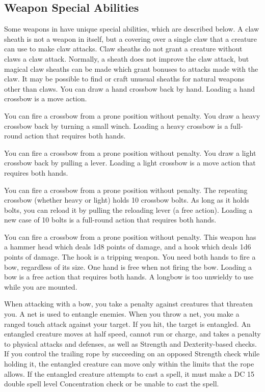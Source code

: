 \subsection{Weapon Special Abilities}
Some weapons in  have unique special abilities, which are described below.
 A claw sheath is not a weapon in itself, but a covering over a single claw that a creature can use to make claw attacks. Claw sheaths do not grant a creature without claws a claw attack. Normally, a sheath does not improve the claw attack, but magical claw sheaths can be made which grant bonuses to attacks made with the claw. It may be possible to find or craft unusual sheaths for natural weapons other than claws.
 You can draw a hand crossbow back by hand. Loading a hand crossbow is a move action.
\par You can fire a crossbow from a prone position without penalty.
 You draw a heavy crossbow back by turning a small winch. Loading a heavy crossbow is a full-round action that requires both hands.
\par You can fire a crossbow from a prone position without penalty.
 You draw a light crossbow back by pulling a lever. Loading a light crossbow is a move action that requires both hands.
\par You can fire a crossbow from a prone position without penalty.
 The repeating crossbow (whether heavy or light) holds 10 crossbow bolts. As long as it holds bolts, you can reload it by pulling the reloading lever (a free action). Loading a new case of 10 bolts is a full-round action that requires both hands.
\par You can fire a crossbow from a prone position without penalty.
 This weapon has a hammer head which deals 1d8 points of damage, and a hook which deals 1d6 points of damage. The hook is a tripping weapon.
 You need both hands to fire a bow, regardless of its size. One hand is free when not firing the bow. Loading a bow is a free action that requires both hands. A longbow is too unwieldy to use while you are mounted.
\par When attacking with a bow, you take a  penalty against creatures that threaten you.
 A net is used to entangle enemies. When you throw a net, you make a ranged touch attack against your target. If you hit, the target is entangled. An entangled creature moves at half speed, cannot run or charge, and takes a  penalty to physical attacks and defenses, as well as Strength and Dexterity-based checks. If you control the trailing rope by succeeding on an opposed Strength check while holding it, the entangled creature can move only within the limits that the rope allows. If the entangled creature attempts to cast a spell, it must make a DC 15 \add double spell level Concentration check or be unable to cast the spell.
